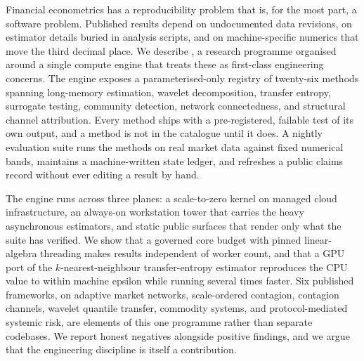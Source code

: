 Financial econometrics has a reproducibility problem that is, for the most part,
a software problem. Published results depend on undocumented data revisions, on
estimator details buried in analysis scripts, and on machine-specific numerics
that move the third decimal place. We describe \engine{}, a research programme
organised around a single compute engine that treats these as first-class
engineering concerns. The engine exposes a parameterised-only registry of
twenty-six methods spanning long-memory estimation, wavelet decomposition,
transfer entropy, surrogate testing, community detection, network connectedness,
and structural channel attribution. Every method ships with a pre-registered,
failable test of its own output, and a method is not in the catalogue until it
does. A nightly evaluation suite runs the methods on real market data against
fixed numerical bands, maintains a machine-written state ledger, and refreshes a
public claims record without ever editing a result by hand.

The engine runs across three planes: a scale-to-zero kernel on managed cloud
infrastructure, an always-on workstation tower that carries the heavy
asynchronous estimators, and static public surfaces that render only what the
suite has verified. We show that a governed core budget with pinned
linear-algebra threading makes results independent of worker count, and that a
GPU port of the $k$-nearest-neighbour transfer-entropy estimator reproduces the
CPU value to within machine epsilon while running several times faster. Six
published frameworks, on adaptive market networks, scale-ordered contagion,
contagion channels, wavelet quantile transfer, commodity systems, and
protocol-mediated systemic risk, are elements of this one programme rather than
separate codebases. We report honest negatives alongside positive findings, and
we argue that the engineering discipline is itself a contribution.
